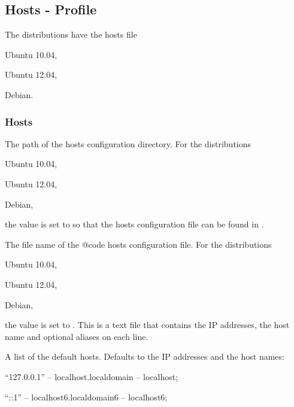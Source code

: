 \subsection{Hosts - Profile}

The distributions have the hosts file
\begin{compactitem}
\item[\TheDistribution{ubuntu}] Ubuntu 10.04,
\item[\TheDistribution{ubuntu}] Ubuntu 12.04,
\item[\TheDistribution{debian}] Debian.
\end{compactitem}

\subsubsection*{Hosts}


The path of the hosts configuration directory.
For the distributions 
\begin{inparaitem}
\item[\TheDistribution{ubuntu}] Ubuntu 10.04,
\item[\TheDistribution{ubuntu}] Ubuntu 12.04,
\item[\TheDistribution{debian}] Debian,
\end{inparaitem}
the value is set to  so that the hosts configuration 
file can be found in .


The file name of the {@code hosts} configuration file.
For the distributions 
\begin{inparaitem}
\item[\TheDistribution{ubuntu}] Ubuntu 10.04,
\item[\TheDistribution{ubuntu}] Ubuntu 12.04,
\item[\TheDistribution{debian}] Debian,
\end{inparaitem}
the value is set to . This is a text file that contains 
the IP addresses, the host name and optional aliases on each line.


A list of the default hosts.
Defaults to the IP addresses and the host names:
\begin{compactitem}
\item ``127.0.0.1'' -- localhost.localdomain -- localhost;
\item ``::1'' -- localhost6.localdomain6 -- localhost6;
\end{compactitem}

